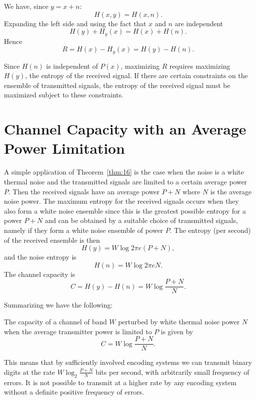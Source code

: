 We have, since $y=x+n$:
$$
H(x,y)=H(x,n).
$$
Expanding the left side and using the fact that $x$ and $n$ are independent
$$
H(y)+H_y(x)=H(x)+H(n).
$$
Hence
$$
R=H(x)-H_y(x)=H(y)-H(n).
$$

Since $H(n)$ is independent of $P(x)$, maximizing $R$ requires maximizing
$H(y)$, the entropy of the received signal.  If there are certain
constraints on the ensemble of transmitted signals, the entropy of the
received signal must be maximized subject to these constraints.

\section{Channel Capacity with an Average Power Limitation}

A simple application of Theorem~\ref{thm:16} is the case when the noise is
a white thermal noise and the transmitted signals are limited to a certain
average power $P$.  Then the received signals have an average power $P+N$
where $N$ is the average noise power.  The maximum entropy for the received
signals occurs when they also form a white noise ensemble since this is the
greatest possible entropy for a power $P+N$ and can be obtained by a
suitable choice of transmitted signals, namely if they form a white noise
ensemble of power $P$.  The entropy (per second) of the received ensemble
is then
$$
H(y)=W\log 2\pi e(P+N),
$$
and the noise entropy is
$$
H(n)=W\log 2\pi e N.
$$
The channel capacity is
$$
C=H(y)-H(n)=W\log\frac{P+N}{N}.
$$

Summarizing we have the following:

\begin{theorem}
\label{thm:17}
The capacity of a channel of band $W$ perturbed by white thermal noise
power $N$ when the average transmitter power is limited to $P$ is given
by 
$$
C=W\log\frac{P+N}{N}.
$$
\end{theorem}

This means that by sufficiently involved encoding systems we can
transmit binary digits at the rate $\displaystyle W\log_2\frac{P+N}{N}$ bits
per second, with arbitrarily small frequency of errors.  It is not possible
to transmit at a higher rate by any encoding system without a definite
positive frequency of errors.

